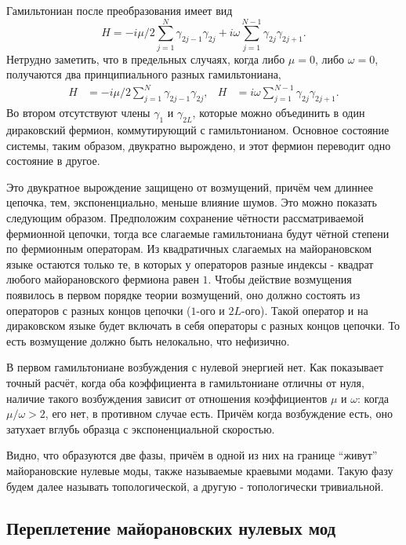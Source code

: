 \documentclass[a4paper,12pt]{article}
\theoremstyle{plain} %
\theoremstyle{definition} %
\theoremstyle{remark} %
\begin{document}
Гамильтониан после преобразования имеет вид
\begin{equation}
H = -i\mu/2 \sum\limits_{j=1}^N \gamma_{2j-1} \gamma_{2j} + i \omega \sum\limits_{j=1}^{N-1} \gamma_{2j} \gamma_{2j+1}.
\label{eq:main_hamiltonian}
\end{equation}
Нетрудно заметить, что в предельных случаях, когда либо $\mu = 0$, либо $\omega = 0$, получаются два принципиального разных гамильтониана,
\begin{align}
H &= -i\mu/2 \sum\limits_{j=1}^N \gamma_{2j-1} \gamma_{2j}, & H &= i \omega \sum\limits_{j=1}^{N-1} \gamma_{2j} \gamma_{2j+1}.
\end{align}
Во втором отсутствуют члены $\gamma_1$ и $\gamma_{2L}$, которые можно объединить в один дираковский фермион, коммутирующий с гамильтонианом. Основное состояние системы, таким образом, двукратно вырождено, и этот фермион переводит одно состояние в другое.

Это двукратное вырождение защищено от возмущений, причём чем длиннее цепочка, тем, экспоненциально, меньше влияние шумов. Это можно показать следующим образом. Предположим сохранение чётности рассматриваемой фермионной цепочки, тогда все слагаемые гамильтониана будут чётной степени по фермионным операторам. Из квадратичных слагаемых на майорановском языке остаются только те, в которых у операторов разные индексы - квадрат любого майорановского фермиона равен $1$. Чтобы действие возмущения появилось в первом порядке теории возмущений, оно должно состоять из операторов с разных концов цепочки ($1$-ого и $2L$-ого). Такой оператор и на дираковском языке будет включать в себя операторы с разных концов цепочки. То есть возмущение должно быть нелокально, что нефизично. 

В первом гамильтониане возбуждения с нулевой энергией нет. Как показывает точный расчёт, когда оба коэффициента в гамильтониане отличны от нуля, наличие такого возбуждения зависит от отношения коэффициентов $\mu$ и $\omega$: когда $\mu/\omega > 2$, его нет, в противном случае есть. Причём когда возбуждение есть, оно затухает вглубь образца с экспоненциальной скоростью.

Видно, что образуются две фазы, причём в одной из них на границе ``живут'' майорановские нулевые моды, также называемые краевыми модами. Такую фазу будем далее называть топологической, а другую - топологически тривиальной.


\subsection{Переплетение майорановских нулевых мод}
\end{document}
